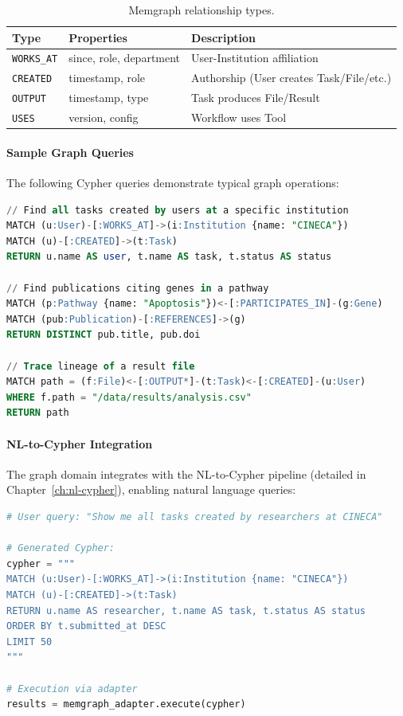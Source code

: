 \begin{table}[htbp]
    \centering
    \caption{Memgraph relationship types.}
    \label{tab:graph-relationships}
    \small
    \begin{tabularx}{\textwidth}{llX}
        \toprule
        \textbf{Type} & \textbf{Properties} & \textbf{Description} \\
        \midrule
        \texttt{WORKS\_AT} & since, role, department & User-Institution affiliation \\
        \texttt{CREATED} & timestamp, role & Authorship (User creates Task/File/etc.) \\
        \texttt{OUTPUT} & timestamp, type & Task produces File/Result \\
        \texttt{USES} & version, config & Workflow uses Tool \\
        \bottomrule
    \end{tabularx}
\end{table}

\paragraph{Sample Graph Queries}
The following Cypher queries demonstrate typical graph operations:

\begin{lstlisting}[language=SQL, caption={Example Cypher queries for common operations.}]
// Find all tasks created by users at a specific institution
MATCH (u:User)-[:WORKS_AT]->(i:Institution {name: "CINECA"})
MATCH (u)-[:CREATED]->(t:Task)
RETURN u.name AS user, t.name AS task, t.status AS status

// Find publications citing genes in a pathway
MATCH (p:Pathway {name: "Apoptosis"})<-[:PARTICIPATES_IN]-(g:Gene)
MATCH (pub:Publication)-[:REFERENCES]->(g)
RETURN DISTINCT pub.title, pub.doi

// Trace lineage of a result file
MATCH path = (f:File)<-[:OUTPUT*]-(t:Task)<-[:CREATED]-(u:User)
WHERE f.path = "/data/results/analysis.csv"
RETURN path
\end{lstlisting}

\paragraph{NL-to-Cypher Integration}
The graph domain integrates with the NL-to-Cypher pipeline (detailed in Chapter~\ref{ch:nl-cypher}), enabling natural language queries:

\begin{lstlisting}[language=Python, caption={NL-to-Cypher pipeline integration.}]
# User query: "Show me all tasks created by researchers at CINECA"

# Generated Cypher:
cypher = """
MATCH (u:User)-[:WORKS_AT]->(i:Institution {name: "CINECA"})
MATCH (u)-[:CREATED]->(t:Task)
RETURN u.name AS researcher, t.name AS task, t.status AS status
ORDER BY t.submitted_at DESC
LIMIT 50
"""

# Execution via adapter
results = memgraph_adapter.execute(cypher)
\end{lstlisting}

